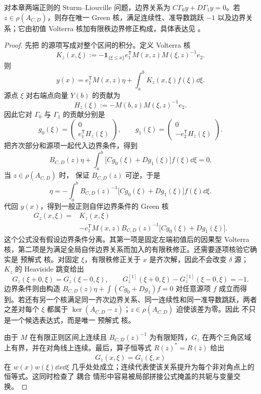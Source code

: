 \begin{theorem}
对本章两端正则的 Sturm--Liouville 问题，边界关系为 $C\Gamma_0y+D\Gamma_1y=0$。若 $z\in\rho(A_{C,D})$，则存在唯一 Green 核，满足连续性、准导数跳跃 $-1$ 以及边界关系；它由初值 Volterra 核加有限秩边界修正构成，具体表达见 。
\end{theorem}
\begin{proof}
先把 的源项写成对整个区间的积分。定义 Volterra 核
\[
 K_z(x,\xi)
 :=-\mathbf 1_{\{\xi\le x\}}
 e_1^{\mathsf T}M(x,z)M(\xi,z)^{-1}e_2.
\]
则
\[
 y(x)=e_1^{\mathsf T}M(x,z)\eta
 +\int_a^bK_z(x,\xi)f(\xi)\dd\xi.
\]
源点 $\xi$ 对右端点向量 $Y(b)$ 的贡献为
\[
 H_z(\xi):=-M(b,z)M(\xi,z)^{-1}e_2.
\]
因此它对 $\Gamma_0$ 与 $\Gamma_1$ 的贡献分别是
\[
 g_0(\xi)=
 \begin{pmatrix}0\\e_1^{\mathsf T}H_z(\xi)\end{pmatrix},
 \qquad
 g_1(\xi)=
 \begin{pmatrix}0\\-e_2^{\mathsf T}H_z(\xi)\end{pmatrix}.
\]
把齐次部分和源项一起代入边界条件，得到
\[
 B_{C,D}(z)\eta
 +\int_a^b\bigl[Cg_0(\xi)+Dg_1(\xi)\bigr]f(\xi)\dd\xi=0.
\]
当 $z\in\rho(A_{C,D})$ 时， 保证 $B_{C,D}(z)$ 可逆，于是
\[
 \eta
 =-\int_a^b B_{C,D}(z)^{-1}
 \bigl[Cg_0(\xi)+Dg_1(\xi)\bigr]f(\xi)\dd\xi.
\]
代回 $y(x)$，得到一般正则自伴边界条件的 Green 核
\begin{equation}\label{eq:math-sl-green-coupled-matrix}
\begin{aligned}
 G_z(x,\xi)
 ={}&K_z(x,\xi)\\
 &-e_1^{\mathsf T}M(x,z)B_{C,D}(z)^{-1}
 \bigl[Cg_0(\xi)+Dg_1(\xi)\bigr].
\end{aligned}
\end{equation}
这个公式没有假设边界条件分离。其第一项是固定左端初值后的因果型 Volterra 核，第二项是为满足全局自伴边界关系而加入的有限秩修正。还需要逐项核验它确实是 预解式 核。对固定 $\xi$，有限秩修正关于 $x$ 是齐次解，因此不会改变 $\delta$ 源；$K_z$ 的 Heaviside 跳变给出
\[
 G_z(\xi+0,\xi)=G_z(\xi-0,\xi),
 \qquad
 G_z^{[1]}(\xi+0,\xi)-G_z^{[1]}(\xi-0,\xi)=-1.
\]
边界条件则由构造 $B_{C,D}(z)\eta+\int(Cg_0+Dg_1)f=0$ 对任意源项 $f$ 成立而得到。若还有另一个核满足同一齐次边界关系、同一连续性和同一准导数跳跃，两者之差对每个 $\xi$ 都属于 $\ker(A_{C,D}-z)$；$z\in\rho(A_{C,D})$ 迫使该差为零。因此 不只是一个候选表达式，而是唯一 预解式 核。

由于 $M$ 在有限正则区间上连续且 $B_{C,D}(z)^{-1}$ 为有限矩阵，$G_z$ 在两个三角区域上有界，并在对角线上连续。最后，算子恒等式 $R(z)^*=R(\overline z)$ 给出
\[
 G_z(x,\xi)=\overline{G_{\overline z}(\xi,x)}
\]
在 $w(x)w(\xi)\dd x\dd\xi$ 几乎处处成立；连续代表使该关系提升为每个非对角点上的恒等式。这同时检查了 耦合 情形中容易被局部拼接公式掩盖的共轭与变量交换。
\end{proof}

